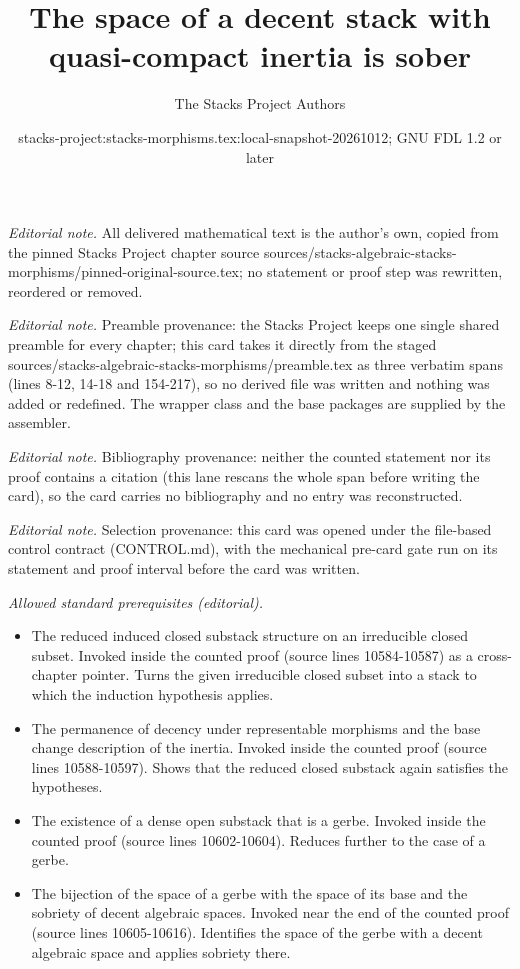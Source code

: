 \documentclass[10pt,a4paper]{amsart}
\title{The space of a decent stack with quasi-compact inertia is sober}
\author{The Stacks Project Authors}
\date{stacks-project:stacks-morphisms.tex:local-snapshot-20261012; GNU FDL 1.2 or later}
\theoremstyle{plain}
\theoremstyle{definition}
\theoremstyle{remark}
\numberwithin{equation}{subsection}
\begin{document}
\maketitle
\noindent\textit{Editorial note.} All delivered mathematical text is the author's own, copied from the pinned Stacks Project chapter source sources/stacks-algebraic-stacks-morphisms/pinned-original-source.tex; no statement or proof step was rewritten, reordered or removed.\par\medskip
\noindent\textit{Editorial note.} Preamble provenance: the Stacks Project keeps one single shared preamble for every chapter; this card takes it directly from the staged sources/stacks-algebraic-stacks-morphisms/preamble.tex as three verbatim spans (lines 8-12, 14-18 and 154-217), so no derived file was written and nothing was added or redefined. The wrapper class and the base packages are supplied by the assembler.\par\medskip
\noindent\textit{Editorial note.} Bibliography provenance: neither the counted statement nor its proof contains a citation (this lane rescans the whole span before writing the card), so the card carries no bibliography and no entry was reconstructed.\par\medskip
\noindent\textit{Editorial note.} Selection provenance: this card was opened under the file-based control contract (CONTROL.md), with the mechanical pre-card gate run on its statement and proof interval before the card was written.\par\medskip
\noindent\textit{Allowed standard prerequisites (editorial).}\begin{itemize}
\item The reduced induced closed substack structure on an irreducible closed subset. Invoked inside the counted proof (source lines 10584-10587) as a cross-chapter pointer. Turns the given irreducible closed subset into a stack to which the induction hypothesis applies.
\item The permanence of decency under representable morphisms and the base change description of the inertia. Invoked inside the counted proof (source lines 10588-10597). Shows that the reduced closed substack again satisfies the hypotheses.
\item The existence of a dense open substack that is a gerbe. Invoked inside the counted proof (source lines 10602-10604). Reduces further to the case of a gerbe.
\item The bijection of the space of a gerbe with the space of its base and the sobriety of decent algebraic spaces. Invoked near the end of the counted proof (source lines 10605-10616). Identifies the space of the gerbe with a decent algebraic space and applies sobriety there.
\end{itemize}\medskip
\end{document}
